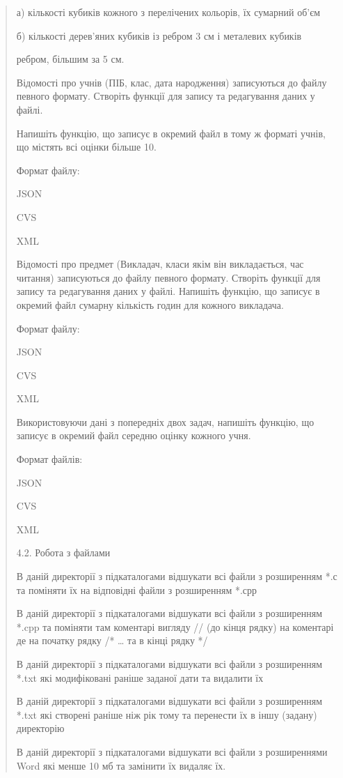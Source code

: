 \documentclass[]{article}
\begin{document}
\begin{quote}
а) кількості кубиків кожного з перелічених кольорів, їх сумарний об'єм

б) кількості дерев'яних кубиків із ребром 3 см і металевих кубиків

ребром, більшим за 5 см.

Відомості про учнів (ПІБ, клас, дата народження) записуються до файлу
певного формату. Створіть функції для запису та редагування даних у
файлі.

Напишіть функцію, що записує в окремий файл в тому ж форматі учнів, що
містять всі оцінки більше 10.

Формат файлу:

JSON

CVS

XML

Відомості про предмет (Викладач, класи якім він викладається, час
читання) записуються до файлу певного формату. Створіть функції для
запису та редагування даних у файлі. Напишіть функцію, що записує в
окремий файл сумарну кількість годин для кожного викладача.

Формат файлу:

JSON

CVS

XML

Використовуючи дані з попередніх двох задач, напишіть функцію, що
записує в окремий файл середню оцінку кожного учня.

Формат файлів:

JSON

CVS

XML

4.2. Робота з файлами

В даній директорії з підкаталогами відшукати всі файли з розширенням *.с
та поміняти їх на відповідні файли з розширенням *.срр

В даній директорії з підкаталогами відшукати всі файли з розширенням
*.cpp та поміняти там коментарі вигляду // (до кінця рядку) на коментарі
де на початку рядку /* \ldots{} та в кінці рядку */

В даній директорії з підкаталогами відшукати всі файли з розширенням
*.txt які модифіковані раніше заданої дати та видалити їх

В даній директорії з підкаталогами відшукати всі файли з розширенням
*.txt які створені раніше ніж рік тому та перенести їх в іншу (задану)
директорію

В даній директорії з підкаталогами відшукати всі файли з розширеннями
Word які менше 10 мб та замінити їх видаляє їх.


\end{quote}
\end{document}
